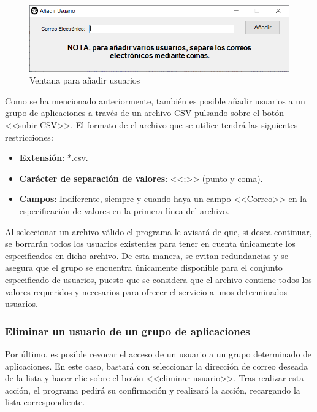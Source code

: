 \begin{figure}[h]
  \centering
  \includegraphics[width=0.8\linewidth]{figures/images/script/addUsuario.PNG}
  \caption{Ventana para añadir usuarios}
  \label{fig:man_ventana_addUsuarios}
\end{figure}

Como se ha mencionado anteriormente, también es posible añadir usuarios a un grupo de aplicaciones a través de un archivo \acs{CSV} pulsando sobre el botón <<subir \acs{CSV}>>. El formato de el archivo que se utilice tendrá las siguientes restricciones:

\begin{itemize}
    \item \textbf{Extensión}: *.csv.
    \item \textbf{Carácter de separación de valores}: <<;>> (punto y coma).
    \item \textbf{Campos}: Indiferente, siempre y cuando haya un campo <<Correo>> en la especificación de valores en la primera línea del archivo.
\end{itemize}

Al seleccionar un archivo válido el programa le avisará de que, si desea continuar, se borrarán todos los usuarios existentes para tener en cuenta únicamente los especificados en dicho archivo. De esta manera, se evitan redundancias y se asegura que el grupo se encuentra únicamente disponible para el conjunto especificado de usuarios, puesto que se considera que el archivo contiene todos los valores requeridos y necesarios para ofrecer el servicio a unos determinados usuarios.

\subsubsection{Eliminar un usuario de un grupo de aplicaciones}
Por último, es posible revocar el acceso de un usuario a un grupo determinado de aplicaciones. En este caso, bastará con seleccionar la dirección de correo deseada de la lista y hacer clic sobre el botón <<eliminar usuario>>. Tras realizar esta acción, el programa pedirá su confirmación y realizará la acción, recargando la lista correspondiente.